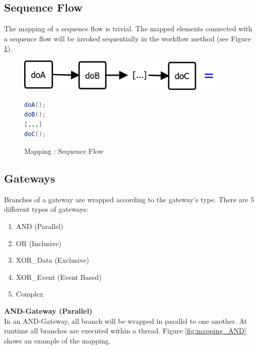 \subsection{Sequence Flow}
The mapping of a sequence flow is trivial. The mapped elements connected with a sequence flow will be invoked sequentially in the workflow method (see Figure \ref{fig:mapping_sequence}).\\

\begin{figure}[h]
\begin{minipage}[c]{0.5\textwidth}
\includegraphics[width=0.9\textwidth]{images/mapping/sequence.png}
\end{minipage}
\begin{minipage}[c]{0.5\textwidth}
\begin{lstlisting}[language=Java]
doA();
doB();
[...]
doC();
\end{lstlisting}
\end{minipage}
\caption{Mapping : Sequence Flow}%
\label{fig:mapping_sequence}%
\end{figure}

\subsection{Gateways}
Branches of a gateway are wrapped according to the gateway's type. There are 5 different types of gateways:
\begin{enumerate}
	\item AND (Parallel)
	\item OR (Inclusive)
	\item XOR\_Data (Exclusive)
	\item XOR\_Event (Event Based)
	\item Complex 
\end{enumerate}

\textbf{AND-Gateway (Parallel)}\\
In an AND-Gateway, all branch will be wrapped in parallel to one another. At runtime all branches are executed within a thread. 
Figure \ref{fig:mapping_AND} shows an example of the mapping. \\

